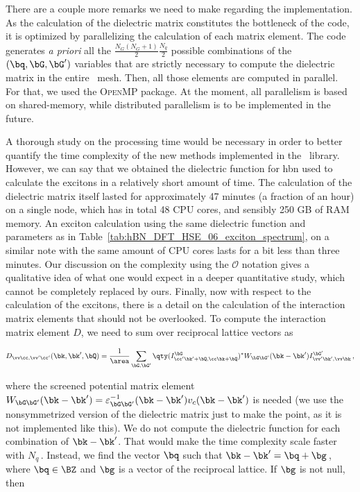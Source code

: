 There are a couple more remarks we need to make regarding the implementation.
As the calculation of the dielectric matrix constitutes the bottleneck of the code, it is optimized by parallelizing the calculation of each matrix element.
The code generates \textit{a priori} all the $\frac{N_{G}(N_{G} + 1)}{2} \frac{N_{q}}{2}$ possible combinations of the $(\bq,\bG,\bG')$ variables that are strictly necessary to compute the dielectric matrix in the entire \bz~mesh.
Then, all those elements are computed in parallel.
For that, we used the \textsc{OpenMP} package.
At the moment, all parallelism is based on shared-memory, while distributed parallelism is to be implemented in the future.

A thorough study on the processing time would be necessary in order to better quantify the time complexity of the new methods implemented in the \xatu~library.
However, we can say that we obtained the dielectric function for \gls{hbn} used to calculate the excitons in a relatively short amount of time.
The calculation of the dielectric matrix itself lasted for approximately 47 minutes (a fraction of an hour) on a single node, which has in total 48 CPU cores, and sensibly 250 GB of RAM memory.
An exciton calculation using the same dielectric function and parameters as in Table~\ref{tab:hBN_DFT_HSE_06_exciton_spectrum}, on a similar note with the same amount of CPU cores lasts for a bit less than three minutes.
Our discussion on the complexity using the $\mathcal{O}$ notation gives a qualitative idea of what one would expect in a deeper quantitative study, which cannot be completely replaced by ours.
Finally, now with respect to the calculation of the excitons, there is a detail on the calculation of the interaction matrix elements that should not be overlooked.
To compute the interaction matrix element $D$, we need to sum over reciprocal lattice vectors as

\begin{equation}
    D_{\vv \cc , \vv ' \cc '}(\bk,\bk',\bQ) = \frac{1}{\area} \sum_{\bG,\bG'} \qty(I^{\bG}_{\cc ' \bk'+\bQ, \cc  \bk+\bQ})^* W_{\bG \bG'}(\bk - \bk') I^{\bG'}_{\vv ' \bk',\vv \bk}\,,
\end{equation}

\noindent where the screened potential matrix element $W_{\bG \bG'}(\bk - \bk') = \varepsilon^{-1}_{\bG \bG'} (\bk - \bk') v_c(\bk - \bk')$ is needed (we use the nonsymmetrized version of the dielectric matrix just to make the point, as it is not implemented like this).
We do not compute the dielectric function for each combination of $\bk-\bk'$.
That would make the time complexity scale faster with $N_{q}$\,.
Instead, we find the vector $\bq$ such that $\bk-\bk' = \bq + \bg$\,, where $\bq \in \BZ$ and $\bg$ is a vector of the reciprocal lattice.
If $\bg$ is not null, then

